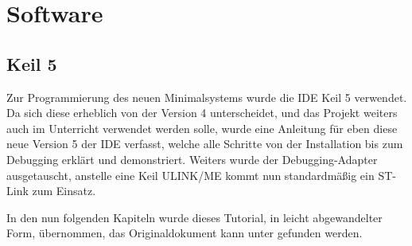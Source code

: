 \section{Software}
\label{sec:software}
\subsection{Keil \uVision{} 5}
\label{sec:uvision-5}
Zur Programmierung des neuen \gls{Minimalsystem}s wurde die \gls{IDE} Keil \uVision{} 5 verwendet. Da sich diese erheblich von der Version 4 unterscheidet, und das Projekt weiters auch im Unterricht verwendet werden solle, wurde eine Anleitung für eben diese neue Version 5 der \gls{IDE} verfasst, welche alle Schritte von der Installation bis zum \gls{Debugging} erklärt und demonstriert. Weiters wurde der \gls{Debugging}-Adapter ausgetauscht, anstelle eine \gls{Keil} ULINK/ME kommt nun standardmäßig ein ST-Link zum Einsatz.

In den nun folgenden Kapiteln wurde dieses Tutorial, in leicht abgewandelter Form, übernommen, das Originaldokument kann unter \cite{doku:tutorial} gefunden werden.


